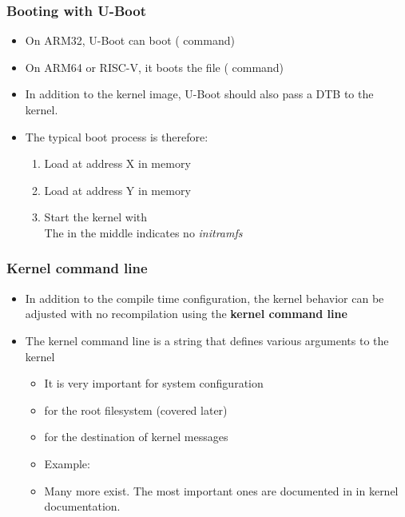 \begin{frame}
  \frametitle{Booting with U-Boot}
  \begin{itemize}
  \item On ARM32, U-Boot can boot  ( command)
  \item On ARM64 or RISC-V, it boots the  file ( command)
  \item In addition to the kernel image, U-Boot should also pass a
        DTB to the kernel.
  \item The typical boot process is therefore:
    \begin{enumerate}
    \item Load  at address X in memory
    \item Load  at address Y in memory
    \item Start the kernel with  \\
      The \code{-} in the middle indicates no {\em initramfs}
    \end{enumerate}
  \end{itemize}
\end{frame}

\begin{frame}
  \frametitle{Kernel command line}
  \begin{itemize}
  \item In addition to the compile time configuration, the kernel
    behavior can be adjusted with no recompilation using the {\bf
      kernel command line}
  \item The kernel command line is a string that defines various
    arguments to the kernel
    \begin{itemize}
    \item It is very important for system configuration
    \item {} for the root filesystem (covered later)
    \item {} for the destination of kernel messages
    \item Example: 
    \item Many more exist. The most important ones are documented
          in  in kernel
          documentation.
    \end{itemize}
  \end{itemize}
\end{frame}

